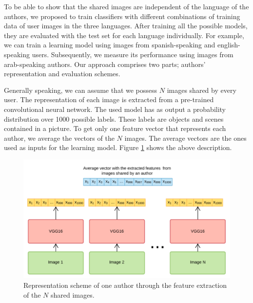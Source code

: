 \documentclass[runningheads]{llncs}
\begin{document}
To be able to show that the shared images are independent of the language
of the authors, we proposed to train classifiers
with different combinations of training data of user images 
in the three languages. After training all the possible models, they
are evaluated with the test set for each language individually.
For example, we can train a learning model using images from spanish-speaking
and english-speaking users. Subsequently, we measure its performance
using images from arab-speaking authors.
Our approach comprises two parts; authors' representation and 
evaluation schemes.


Generally speaking, we can assume that we possess $N$ images shared
by every user. The representation of each image is extracted from 
a pre-trained convolutional neural network. The used model has as output a probability distribution
over 1000 possible labels. These labels are objects and scenes contained
in a picture.
To get only one feature vector that represents each author, 
we average the vectors of the $N$ images. The average vectors 
are the ones used as inputs for the learning model. Figure \ref{fig:img_representation} shows the above description.

\begin{figure}[ht]
    \centering
    \includegraphics[scale=0.25]{img/features_extraction.png}
    \caption{Representation scheme of one author through the 
    feature extraction of the $N$ shared images.}
    \label{fig:img_representation}
\end{figure}

\end{document}
